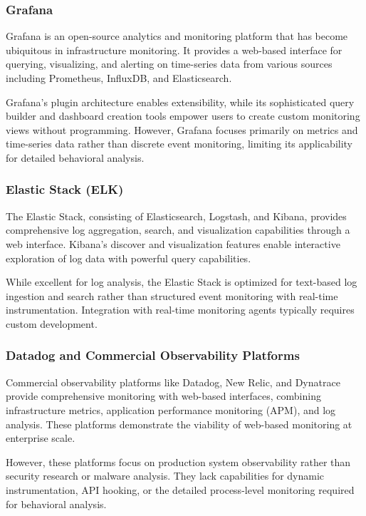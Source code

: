 \subsubsection{Grafana}
Grafana is an open-source analytics and monitoring platform that has become ubiquitous in infrastructure monitoring. It provides a web-based interface for querying, visualizing, and alerting on time-series data from various sources including Prometheus, InfluxDB, and Elasticsearch.

Grafana's plugin architecture enables extensibility, while its sophisticated query builder and dashboard creation tools empower users to create custom monitoring views without programming. However, Grafana focuses primarily on metrics and time-series data rather than discrete event monitoring, limiting its applicability for detailed behavioral analysis.

\subsubsection{Elastic Stack (ELK)}
The Elastic Stack, consisting of Elasticsearch, Logstash, and Kibana, provides comprehensive log aggregation, search, and visualization capabilities through a web interface. Kibana's discover and visualization features enable interactive exploration of log data with powerful query capabilities.

While excellent for log analysis, the Elastic Stack is optimized for text-based log ingestion and search rather than structured event monitoring with real-time instrumentation. Integration with real-time monitoring agents typically requires custom development.

\subsubsection{Datadog and Commercial Observability Platforms}
Commercial observability platforms like Datadog, New Relic, and Dynatrace provide comprehensive monitoring with web-based interfaces, combining infrastructure metrics, application performance monitoring (APM), and log analysis. These platforms demonstrate the viability of web-based monitoring at enterprise scale.

However, these platforms focus on production system observability rather than security research or malware analysis. They lack capabilities for dynamic instrumentation, API hooking, or the detailed process-level monitoring required for behavioral analysis.

